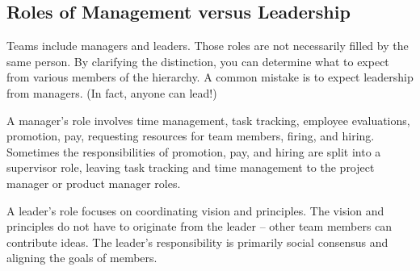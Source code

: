 

\subsection*{Roles of Management versus Leadership}

Teams include managers and leaders. Those roles are not necessarily filled by the same person. By clarifying the distinction, you can determine what to expect from various members of the hierarchy. A common mistake is to expect leadership from managers. (In fact, anyone can lead!)

A manager's role involves time management, task tracking, employee evaluations, promotion, pay, requesting resources for team members, firing, and hiring. Sometimes the responsibilities of promotion, pay, and hiring are split into a supervisor role, leaving task tracking and time management to the project manager or product manager roles.

A leader's role focuses on coordinating vision and principles. The vision and principles do not have to originate from the leader -- other team members can contribute ideas. The leader's responsibility is primarily social consensus and aligning the goals of members. 
